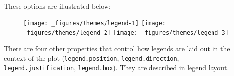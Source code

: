 These options are illustrated below:

\begin{Shaded}
\begin{Highlighting}[]
\StringTok{ }\NormalTok{(} \NormalTok{:}\NormalTok{, } \NormalTok{:}\NormalTok{, } \NormalTok{(}\NormalTok{(}\NormalTok{, }\NormalTok{), } \NormalTok{))}
\StringTok{ } \StringTok{ }\NormalTok{()}

\StringTok{ }\NormalTok{(}
   \NormalTok{(}
     \NormalTok{, }
     \NormalTok{, }
     
  \NormalTok{)}
\NormalTok{)}
\StringTok{ }\NormalTok{(}
   \NormalTok{(} \NormalTok{),}
   \NormalTok{(}\NormalTok{, }\NormalTok{),}
   \NormalTok{(}\NormalTok{, }\NormalTok{)}
\NormalTok{)}
\StringTok{ }\NormalTok{(}
   \NormalTok{(} \NormalTok{),}
   \NormalTok{(} \NormalTok{, } \NormalTok{)}
\NormalTok{)}
\end{Highlighting}
\end{Shaded}

\begin{figure}[H]
  \texttt{[image: \_figures/themes/legend-1]}%
  \texttt{[image: \_figures/themes/legend-2]}%
  \texttt{[image: \_figures/themes/legend-3]}
\end{figure}

There are four other properties that control how legends are laid out in
the context of the plot (\texttt{legend.position},
\texttt{legend.direction}, \texttt{legend.justification},
\texttt{legend.box}). They are described in
\hyperref[sub:legend-layout]{legend layout}.


